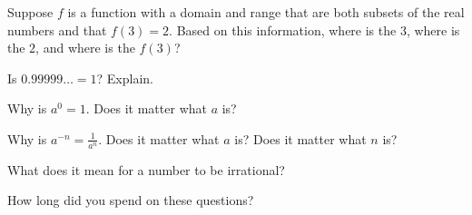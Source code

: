 \documentclass{ximera}
\begin{document}
\begin{question}
Suppose $f$ is a function with a domain and range that are both subsets of the real numbers and that $f(3)=2$.  Based on this information, where is the $3$, where is the $2$, and where is the $f(3)$?  
\begin{freeResponse}
\end{freeResponse}
\end{question}

\begin{question}
Is $0.99999\dots = 1$?  Explain.    
\begin{freeResponse}
\end{freeResponse}
\end{question}

\begin{question}
Why is $a^0 = 1$.  Does it matter what $a$ is?  
\begin{freeResponse}
\end{freeResponse}
\end{question}

\begin{question}
Why is $a^{-n} = \frac{1}{a^n}$.  Does it matter what $a$ is?  Does it matter what $n$ is?  
\begin{freeResponse}
\end{freeResponse}
\end{question}

\begin{question}
What does it mean for a number to be irrational?    
\begin{freeResponse}
\end{freeResponse}
\end{question}

\begin{question}
How long did you spend on these questions?  
\begin{freeResponse}
\end{freeResponse}
\end{question}
\end{document}
